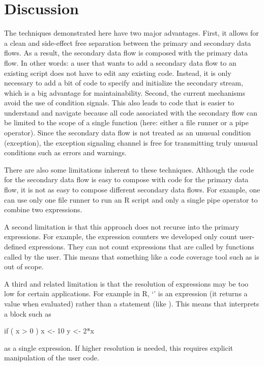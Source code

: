 \section{Discussion}
\label{sect:discussion} 
The techniques demonstrated here have two major advantages. First, it allows
for a clean and side-effect free separation between the primary and secondary
data flows. As a result, the secondary data flow is composed with the primary
data flow. In other words: a user that wants to add a secondary data flow to an
existing script does not have to edit any existing code. Instead, it is only
necessary to add a bit of code to specify and initialize the secondary stream,
which is a big advantage for maintainability.  Second, the current mechanisms
avoid the use of condition signals. This also leads to code that is easier to
understand and navigate because all code associated with the secondary flow can
be limited to the scope of a single function (here: either a file runner or a
pipe operator). Since the secondary data flow is not treated as an unusual
condition (exception), the exception signaling channel is free for transmitting
truly unusual conditions such as errors and warnings.

There are also some limitations inherent to these techniques. Although the code
for the secondary data flow is easy to compose with code for the primary data
flow, it is not as easy to compose different secondary data flows. For example,
one can use only one file runner to run an R script and only a single pipe
operator to combine two expressions. 

A second limitation is that this approach does not recurse into the primary
expressions. For example, the expression counters we developed only count
user-defined expressions. They can not count expressions that are called by
functions called by the user. This means that something like a code coverage
tool such as  is out of scope.

A third and related limitation is that the resolution of expressions may be too
low for certain applications. For example in R, `' is an expression
(it returns a value when evaluated) rather than a statement (like ).
This means that  interprets a block such as
\begin{example}
  if ( x > 0 ){
   x <- 10
   y <- 2*x
  }
\end{example}
as a single expression. If higher resolution is needed, this requires explicit
manipulation of the user code. 

